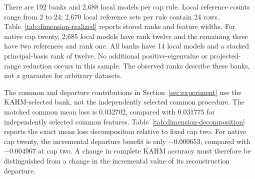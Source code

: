 There are 192 banks and 2,688 local models per cap rule. Local reference
counts range from 2 to 24; 2,670 local reference sets per rule contain 24
rows. Table~\ref{tab:dimension-realized} reports stored ranks and feature
widths. For native cap twenty, 2,685 local models have rank twelve and the
remaining three have two references and rank one. All banks have 14 local
models and a stacked principal-basis rank of twelve. No additional
positive-eigenvalue or projected-range reduction occurs in this sample.
The observed ranks describe these banks, not a guarantee for arbitrary
datasets.

\begin{table}[!htbp]
\centering\small
\setlength{\tabcolsep}{4pt}
\caption{Realized geometry over the complete task roster. Rank statistics
refer to the 2,688 local models in each row; ``Rank 12'' counts full-ambient
local bases. Width ranges refer to 192 complete banks. The full departure
readout adds the common and departure widths. Stacked-basis rank is twelve
for every bank, even when its individual local ranks are small.}
\label{tab:dimension-realized}

\end{table}

The common and departure contributions in Section~\ref{sec:experiment}
use the KAHM-selected bank, not the independently selected common procedure.
The matched common mean loss is 0.032702, compared with 0.031775 for
independently selected common features. Table~\ref{tab:dimension-decomposition}
reports the exact mean loss decomposition relative to fixed cap two.
For native cap twenty, the incremental departure benefit is only
$-0.000653$, compared with $-0.004967$ at cap two. A change in complete
KAHM accuracy must therefore be distinguished from a change in the
incremental value of its reconstruction departure.

\begin{table}[!htbp]
\centering\small
\setlength{\tabcolsep}{4pt}
\caption{Nonlinear loss decomposition relative to the fixed-cap-two
procedure. Total change equals common change plus increment change.
The final column gives the new KAHM-minus-common loss on the same bank.
Negative values in the first two columns denote improvement; a positive
increment change denotes a weaker departure benefit. These are descriptive
identities between calibrated predictor losses.}
\label{tab:dimension-decomposition}

\end{table}

